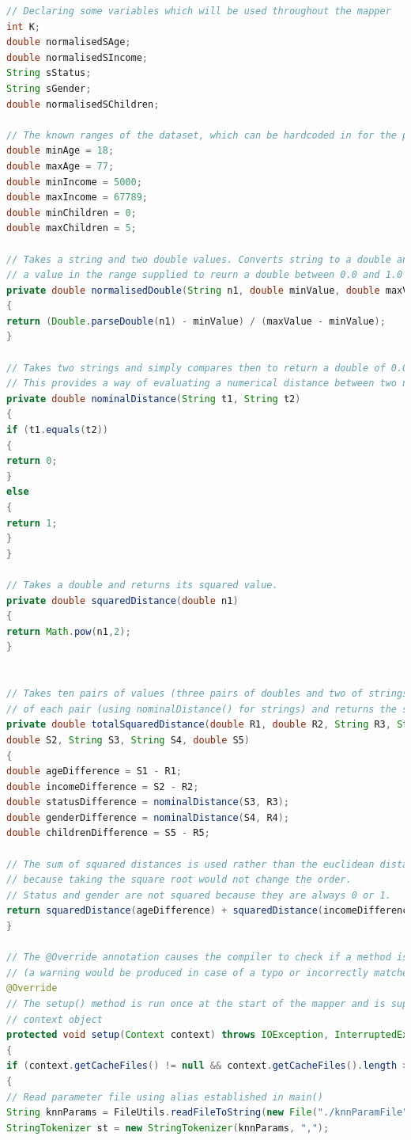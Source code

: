 \documentclass[11pt,article]{memoir}
\begin{document}
\begin{flushleft}
\begin{lstlisting}[language=java]
// Declaring some variables which will be used throughout the mapper
int K;
double normalisedSAge;
double normalisedSIncome;
String sStatus;
String sGender;
double normalisedSChildren;

// The known ranges of the dataset, which can be hardcoded in for the purposes of this example
double minAge = 18;
double maxAge = 77;
double minIncome = 5000;
double maxIncome = 67789;
double minChildren = 0;
double maxChildren = 5;

// Takes a string and two double values. Converts string to a double and normalises it to
// a value in the range supplied to reurn a double between 0.0 and 1.0 
private double normalisedDouble(String n1, double minValue, double maxValue)
{
return (Double.parseDouble(n1) - minValue) / (maxValue - minValue);
}

// Takes two strings and simply compares then to return a double of 0.0 (non-identical) or 1.0 (identical).
// This provides a way of evaluating a numerical distance between two nominal values.
private double nominalDistance(String t1, String t2)
{
if (t1.equals(t2))
{
return 0;
}
else
{
return 1;
}
}

// Takes a double and returns its squared value.
private double squaredDistance(double n1)
{
return Math.pow(n1,2);
}


// Takes ten pairs of values (three pairs of doubles and two of strings), finds the difference between the members
// of each pair (using nominalDistance() for strings) and returns the sum of the squared differences as a double.
private double totalSquaredDistance(double R1, double R2, String R3, String R4, double R5, double S1,
double S2, String S3, String S4, double S5)
{	
double ageDifference = S1 - R1;
double incomeDifference = S2 - R2;
double statusDifference = nominalDistance(S3, R3);
double genderDifference = nominalDistance(S4, R4);
double childrenDifference = S5 - R5;

// The sum of squared distances is used rather than the euclidean distance
// because taking the square root would not change the order.
// Status and gender are not squared because they are always 0 or 1.
return squaredDistance(ageDifference) + squaredDistance(incomeDifference) + statusDifference + genderDifference + squaredDistance(childrenDifference);
}

// The @Override annotation causes the compiler to check if a method is actually being overridden
// (a warning would be produced in case of a typo or incorrectly matched parameters)
@Override
// The setup() method is run once at the start of the mapper and is supplied with MapReduce's
// context object
protected void setup(Context context) throws IOException, InterruptedException
{
if (context.getCacheFiles() != null && context.getCacheFiles().length > 0)
{
// Read parameter file using alias established in main()
String knnParams = FileUtils.readFileToString(new File("./knnParamFile"));
StringTokenizer st = new StringTokenizer(knnParams, ",");


\end{lstlisting}
\end{flushleft}
\end{document}
